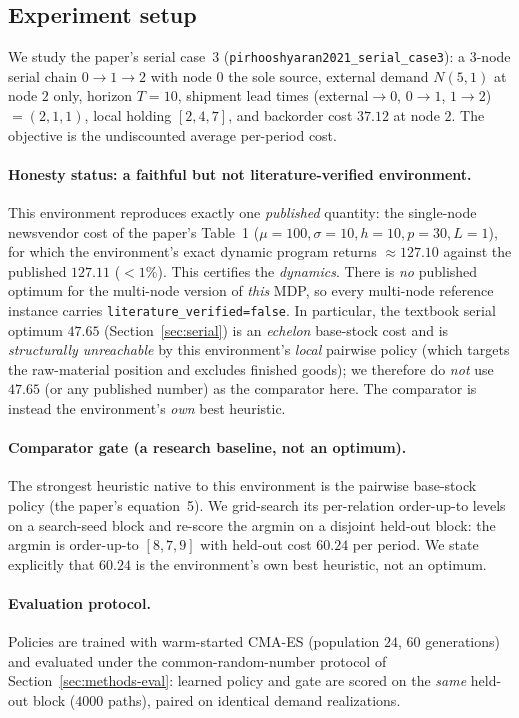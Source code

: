 \subsection{Experiment setup}
\label{sec:pirhoo-setup}

We study the paper's serial case~3 (\texttt{pirhooshyaran2021\_serial\_case3}): a 3-node serial chain
$0\!\to\!1\!\to\!2$ with node $0$ the sole source, external demand $N(5,1)$ at node $2$ only, horizon
$T=10$, shipment lead times (external$\to$0, $0\to1$, $1\to2$) $=(2,1,1)$, local holding $[2,4,7]$, and
backorder cost $37.12$ at node $2$. The objective is the undiscounted average per-period cost.

\paragraph{Honesty status: a faithful but not literature-verified environment.}
This environment reproduces exactly one \emph{published} quantity: the single-node newsvendor cost of
the paper's Table~1 ($\mu=100,\sigma=10,h=10,p=30,L=1$), for which the environment's exact dynamic
program returns $\approx127.10$ against the published $127.11$ ($<1\%$). This certifies the
\emph{dynamics}. There is \emph{no} published optimum for the multi-node version of \emph{this} MDP, so
every multi-node reference instance carries \texttt{literature\_verified=false}. In particular, the
textbook serial optimum $47.65$ (Section~\ref{sec:serial}) is an \emph{echelon} base-stock cost and is
\emph{structurally unreachable} by this environment's \emph{local} pairwise policy (which targets the
raw-material position and excludes finished goods); we therefore do \emph{not} use $47.65$ (or any
published number) as the comparator here. The comparator is instead the environment's \emph{own} best
heuristic.

\paragraph{Comparator gate (a research baseline, not an optimum).}
The strongest heuristic native to this environment is the pairwise base-stock policy (the paper's
equation~5). We grid-search its per-relation order-up-to levels on a search-seed block and re-score the
argmin on a disjoint held-out block: the argmin is order-up-to $[8,7,9]$ with held-out cost
$60.24$ per period. We state explicitly that $60.24$ is the environment's own best heuristic, not an
optimum.

\paragraph{Evaluation protocol.}
Policies are trained with warm-started CMA-ES (population $24$, $60$ generations) and evaluated under
the common-random-number protocol of Section~\ref{sec:methods-eval}: learned policy and gate are scored
on the \emph{same} held-out block ($4000$ paths), paired on identical demand realizations.


